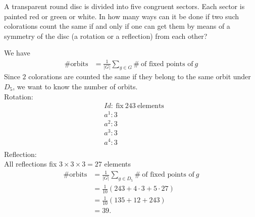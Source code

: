\documentclass{article}
\begin{document}
\begin{homeworkProblem}
    A transparent round disc is divided into five congruent sectors.
    Each sector is painted red or green or white.
    In how many ways can it be done if two such colorations count
    the same if and only if one can get them by means of a symmetry of the disc
    (a rotation or a reflection) from each other?

    \solution
    
    We have 
    \begin{align}
        \# \text{orbits} &= \frac{ 1 }{ \lvert G \rvert  }\sum_{g \in G} \# \ \text{of fixed points of} \ g
    \end{align}
    Since $2$ colorations are counted the same
    if they belong to the same orbit under $D_5$,
    we want to know the number of orbits.\\
    Rotation:
    \begin{align}
        &Id: \ \text{fix} \ 243 \ \text{elements}\\
        &a^1: 3\\
        &a^2: 3\\
        &a^3: 3\\
        &a^4: 3\\
    \end{align}
    Reflection:\\
    All reflections fix $3 \times 3 \times 3 = 27$ elements
    \begin{align}
        \# \text{orbits} &= \frac{ 1 }{ \lvert G \rvert  }\sum_{g \in D_5} \# \ \text{of fixed points of} \ g \\
        &= \frac{ 1 }{ 10 } (243 + 4 \cdot 3 + 5 \cdot 27)\\
        &= \frac{ 1 }{ 10 } (135 + 12 + 243) \\
        &= 39.
    \end{align}


    

    
    
\end{homeworkProblem}

\pagebreak
\end{document}
